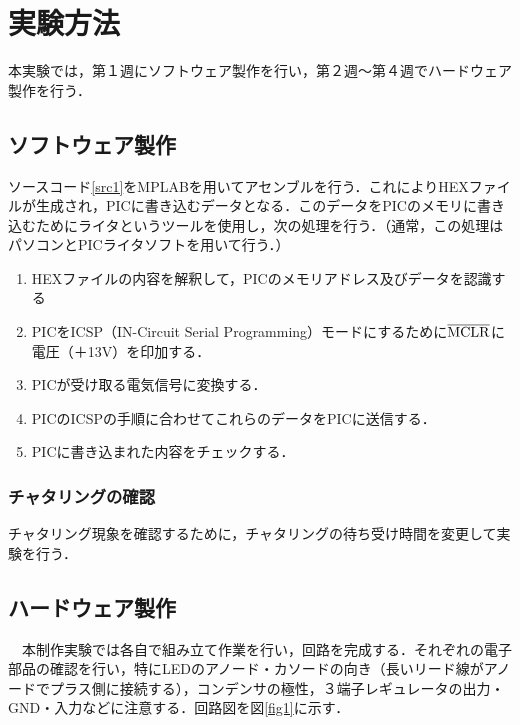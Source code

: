 \documentclass[11pt,a4paper]{jsarticle}
\begin{document}


\newpage

\section{実験方法}
本実験では，第１週にソフトウェア製作を行い，第２週〜第４週でハードウェア製作を行う．

\subsection{ソフトウェア製作}
 ソースコード\ref{src1}をMPLABを用いてアセンブルを行う．これによりHEXファイルが生成され，PICに書き込むデータとなる．このデータをPICのメモリに書き込むためにライタというツールを使用し，次の処理を行う．（通常，この処理はパソコンとPICライタソフトを用いて行う．）

\begin{enumerate}
 \item HEXファイルの内容を解釈して，PICのメモリアドレス及びデータを認識する
 \item PICをICSP（IN-Circuit Serial Programming）モードにするために$\overline{\rm{MCLR}}$に電圧（＋13V）を印加する．
 \item PICが受け取る電気信号に変換する．
 \item PICのICSPの手順に合わせてこれらのデータをPICに送信する．
 \item PICに書き込まれた内容をチェックする．
\end{enumerate}

\subsubsection{チャタリングの確認}
チャタリング現象を確認するために，チャタリングの待ち受け時間を変更して実験を行う．

\subsection{ハードウェア製作}
　本制作実験では各自で組み立て作業を行い，回路を完成する．それぞれの電子部品の確認を行い，特にLEDのアノード・カソードの向き（長いリード線がアノードでプラス側に接続する），コンデンサの極性，３端子レギュレータの出力・GND・入力などに注意する．回路図を図\ref{fig1}に示す．

\newpage
\end{document}
